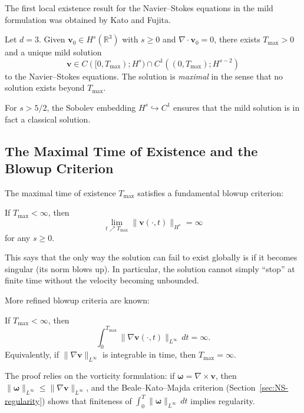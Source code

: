 The first local existence result for the Navier--Stokes equations in the mild formulation was obtained by Kato and Fujita.

\begin{theorem}
\label{thm:kato-fujita}
Let $d = 3$. Given $\mathbf{v}_0 \in H^s(\mathbb{R}^3)$ with $s \ge 0$ and $\nabla \cdot \mathbf{v}_0 = 0$, there exists $T_{\max} > 0$ and a unique mild solution
\[
\mathbf{v} \in C([0, T_{\max}); H^s) \cap C^1((0, T_{\max}); H^{s-2})
\]
to the Navier--Stokes equations. The solution is \emph{maximal} in the sense that no solution exists beyond $T_{\max}$.
\end{theorem}

For $s > 5/2$, the Sobolev embedding $H^s \hookrightarrow C^1$ ensures that the mild solution is in fact a classical solution.

\subsection{The Maximal Time of Existence and the Blowup Criterion}

The maximal time of existence $T_{\max}$ satisfies a fundamental blowup criterion:

\begin{theorem}
\label{thm:blowup}
If $T_{\max} < \infty$, then
\[
\lim_{t \nearrow T_{\max}} \|\mathbf{v}(\cdot, t)\|_{H^s} = \infty
\]
for any $s \ge 0$.
\end{theorem}

This says that the only way the solution can fail to exist globally is if it becomes singular (its norm blows up). In particular, the solution cannot simply ``stop'' at finite time without the velocity becoming unbounded.

More refined blowup criteria are known:

\begin{theorem}
\label{thm:serrin-blowup}
If $T_{\max} < \infty$, then
\[
\int_0^{T_{\max}} \|\nabla \mathbf{v}(\cdot, t)\|_{L^\infty} \, dt = \infty.
\]
Equivalently, if $\|\nabla \mathbf{v}\|_{L^\infty}$ is integrable in time, then $T_{\max} = \infty$.
\end{theorem}

The proof relies on the vorticity formulation: if $\boldsymbol{\omega} = \nabla \times \mathbf{v}$, then $\|\boldsymbol{\omega}\|_{L^\infty} \le \|\nabla \mathbf{v}\|_{L^\infty}$, and the Beale--Kato--Majda criterion (Section~\ref{sec:NS-regularity}) shows that finiteness of $\int_0^T \|\boldsymbol{\omega}\|_{L^\infty} \, dt$ implies regularity.

